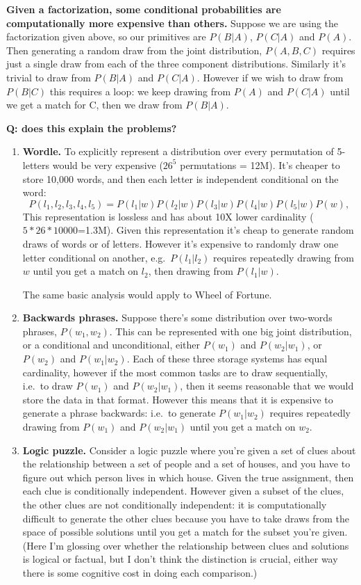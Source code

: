 \documentclass[
  11pt,
  letterpaper,
  DIV=11,
  numbers=noendperiod,
  oneside]{scrartcl}
\begin{document}
\textbf{Given a factorization, some conditional probabilities are
computationally more expensive than others.} Suppose we are using the
factorization given above, so our primitives are \(P(B|A)\), \(P(C|A)\)
and \(P(A)\). Then generating a random draw from the joint distribution,
\(P(A,B,C)\) requires just a single draw from each of the three
component distributions. Similarly it's trivial to draw from \(P(B|A)\)
and \(P(C|A)\). However if we wish to draw from \(P(B|C)\) this requires
a loop: we keep drawing from \(P(A)\) and \(P(C|A)\) until we get a
match for C, then we draw from \(P(B|A)\).

\textbf{Q: does this explain the problems?}

\begin{enumerate}
\def\labelenumi{\arabic{enumi}.}
\item
  \textbf{Wordle.} To explicitly represent a distribution over every
  permutation of 5-letters would be very expensive (\(26^5\)
  permutations = 12M). It's cheaper to store 10,000 words, and then each
  letter is independent conditional on the word:
  \[P(l_1,l_2,l_3,l_4,l_5)=P(l_1|w)P(l_2|w)P(l_3|w)P(l_4|w)P(l_5|w)P(w),\]
  This representation is lossless and has about 10X lower cardinality
  (\(5*26*10000\)=1.3M). Given this representation it's cheap to
  generate random draws of words or of letters. However it's expensive
  to randomly draw one letter conditional on another,
  e.g.~\(P(l_1|l_2)\) requires repeatedly drawing from \(w\) until you
  get a match on \(l_2\), then drawing from \(P(l_1|w)\).

  The same basic analysis would apply to Wheel of Fortune.
\item
  \textbf{Backwards phrases.} Suppose there's some distribution over
  two-words phrases, \(P(w_1,w_2)\). This can be represented with one
  big joint distribution, or a conditional and unconditional, either
  \(P(w_1)\) and \(P(w_2|w_1)\), or \(P(w_2)\) and \(P(w_1|w_2)\). Each
  of these three storage systems has equal cardinality, however if the
  most common tasks are to draw sequentially, i.e.~to draw \(P(w_1)\)
  and \(P(w_2|w_1)\), then it seems reasonable that we would store the
  data in that format. However this means that it is expensive to
  generate a phrase backwards: i.e.~to generate \(P(w_1|w_2)\) requires
  repeatedly drawing from \(P(w_1)\) and \(P(w_2|w_1)\) until you get a
  match on \(w_2\).
\item
  \textbf{Logic puzzle.} Consider a logic puzzle where you're given a
  set of clues about the relationship between a set of people and a set
  of houses, and you have to figure out which person lives in which
  house. Given the true assignment, then each clue is conditionally
  independent. However given a subset of the clues, the other clues are
  not conditionally independent: it is computationally difficult to
  generate the other clues because you have to take draws from the space
  of possible solutions until you get a match for the subset you're
  given. (Here I'm glossing over whether the relationship between clues
  and solutions is logical or factual, but I don't think the distinction
  is crucial, either way there is some cognitive cost in doing each
  comparison.)
\end{enumerate}
\end{document}
